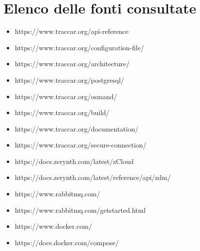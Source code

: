 \documentclass[a4paper,titlepage,12pt]{report}
\begin{document}
\section{
Elenco delle fonti consultate}
\begin{itemize}
\item https://www.traccar.org/api-reference
\item https://www.traccar.org/configuration-file/
\item https://www.traccar.org/architecture/
\item https://www.traccar.org/postgresql/
\item https://www.traccar.org/osmand/ 
\item https://www.traccar.org/build/
\item https://www.traccar.org/documentation/
\item https://www.traccar.org/secure-connection/
\item https://docs.zerynth.com/latest/zCloud
\item https://docs.zerynth.com/latest/reference/api/zdm/
\item https://www.rabbitmq.com/
\item https://www.rabbitmq.com/getstarted.html
\item https://www.docker.com/
\item https://docs.docker.com/compose/ 

\end{itemize}
\end{document}
